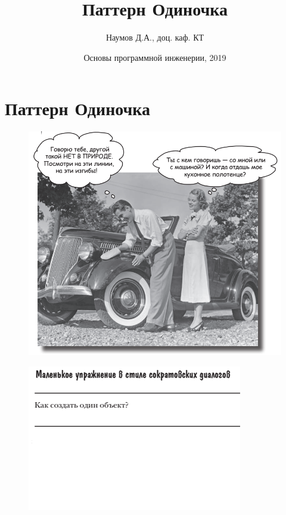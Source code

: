 \documentclass{beamer}
\title[Software Design]{Паттерн Одиночка}
\author{Наумов Д.А., доц. каф. КТ}
\date[03.12.2019] {Основы программной инженерии, 2019}
\begin{document}
\begin{frame}
  \titlepage
\end{frame}
  
\section{Паттерн Одиночка}

\begin{frame}
\begin{figure}[h]
\centering
\includegraphics[scale=0.5]{images/lec11-pic01.png}
\label{pic-sort}
\end{figure}
\end{frame}

\begin{frame}
\begin{figure}[h]
\centering
\includegraphics[scale=1.0]{images/lec11-pic02-0.png}
\label{pic-sort}
\end{figure}
\end{frame}
\end{document}
